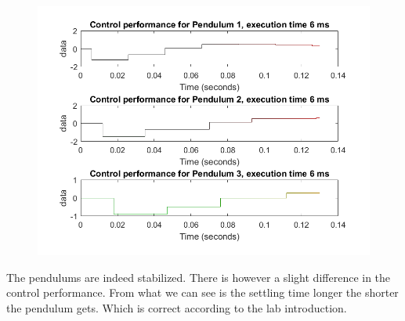 \documentclass[12pt,a4paper]{article}
\begin{document}
    \begin{center}
      \begin{figure}
        \includegraphics[scale=0.5]{ex32.png}
      \end{figure}
      \caption{Control signal for pendulum}
    \end{center}

    The pendulums are indeed stabilized. There is however a slight difference
    in the control performance. From what we can see is the settling
    time longer the shorter the pendulum gets. Which is correct
    according to the lab introduction. 
\end{document}
